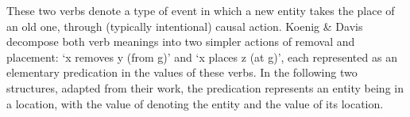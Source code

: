 \documentclass[output=paper
 	        ,biblatex
                ,babelshorthands
                ,newtxmath
                ,draftmode
                ,colorlinks, citecolor=brown
]{langscibook}
\begin{document}
\noindent
These two verbs denote a type of event in which a new entity takes the place of an old one, through (typically intentional) causal action.
Koenig \& Davis decompose both verb meanings into two simpler actions of removal and placement: `x removes y (from g)' and `x places z (at g)', each represented as an elementary predication in the  values of these verbs.  In the following two structures, adapted from their work, the  predication represents an entity being in a location, with the value of  denoting the entity and the value of  its location.


\end{document}
